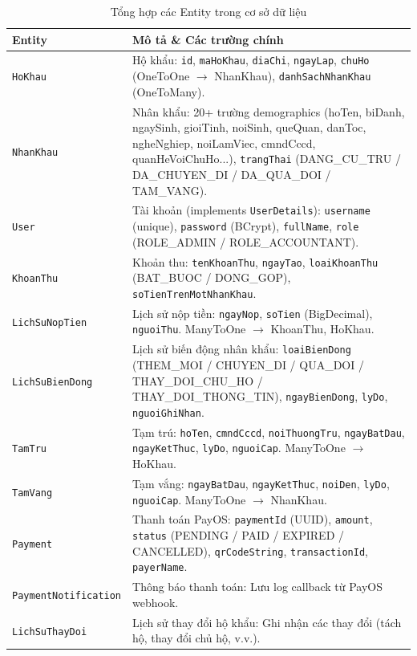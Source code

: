 \documentclass[12pt,a4paper]{article}
\begin{document}
\begin{table}[h!]
\centering
\small
\begin{tabularx}{\textwidth}{|l|X|}
\hline
\textbf{Entity} & \textbf{Mô tả \& Các trường chính} \\
\hline
\texttt{HoKhau} & Hộ khẩu: \texttt{id}, \texttt{maHoKhau}, \texttt{diaChi}, \texttt{ngayLap}, \texttt{chuHo} (OneToOne $\rightarrow$ NhanKhau), \texttt{danhSachNhanKhau} (OneToMany).\\
\hline
\texttt{NhanKhau} & Nhân khẩu: 20+ trường demographics (hoTen, biDanh, ngaySinh, gioiTinh, noiSinh, queQuan, danToc, ngheNghiep, noiLamViec, cmndCccd, quanHeVoiChuHo...), \texttt{trangThai} (DANG\_CU\_TRU / DA\_CHUYEN\_DI / DA\_QUA\_DOI / TAM\_VANG).\\
\hline
\texttt{User} & Tài khoản (implements \texttt{UserDetails}): \texttt{username} (unique), \texttt{password} (BCrypt), \texttt{fullName}, \texttt{role} (ROLE\_ADMIN / ROLE\_ACCOUNTANT).\\
\hline
\texttt{KhoanThu} & Khoản thu: \texttt{tenKhoanThu}, \texttt{ngayTao}, \texttt{loaiKhoanThu} (BAT\_BUOC / DONG\_GOP), \texttt{soTienTrenMotNhanKhau}.\\
\hline
\texttt{LichSuNopTien} & Lịch sử nộp tiền: \texttt{ngayNop}, \texttt{soTien} (BigDecimal), \texttt{nguoiThu}. ManyToOne $\rightarrow$ KhoanThu, HoKhau.\\
\hline
\texttt{LichSuBienDong} & Lịch sử biến động nhân khẩu: \texttt{loaiBienDong} (THEM\_MOI / CHUYEN\_DI / QUA\_DOI / THAY\_DOI\_CHU\_HO / THAY\_DOI\_THONG\_TIN), \texttt{ngayBienDong}, \texttt{lyDo}, \texttt{nguoiGhiNhan}.\\
\hline
\texttt{TamTru} & Tạm trú: \texttt{hoTen}, \texttt{cmndCccd}, \texttt{noiThuongTru}, \texttt{ngayBatDau}, \texttt{ngayKetThuc}, \texttt{lyDo}, \texttt{nguoiCap}. ManyToOne $\rightarrow$ HoKhau.\\
\hline
\texttt{TamVang} & Tạm vắng: \texttt{ngayBatDau}, \texttt{ngayKetThuc}, \texttt{noiDen}, \texttt{lyDo}, \texttt{nguoiCap}. ManyToOne $\rightarrow$ NhanKhau.\\
\hline
\texttt{Payment} & Thanh toán PayOS: \texttt{paymentId} (UUID), \texttt{amount}, \texttt{status} (PENDING / PAID / EXPIRED / CANCELLED), \texttt{qrCodeString}, \texttt{transactionId}, \texttt{payerName}.\\
\hline
\texttt{PaymentNotification} & Thông báo thanh toán: Lưu log callback từ PayOS webhook.\\
\hline
\texttt{LichSuThayDoi} & Lịch sử thay đổi hộ khẩu: Ghi nhận các thay đổi (tách hộ, thay đổi chủ hộ, v.v.).\\
\hline
\end{tabularx}
\caption{Tổng hợp các Entity trong cơ sở dữ liệu}
\end{table}
\end{document}
